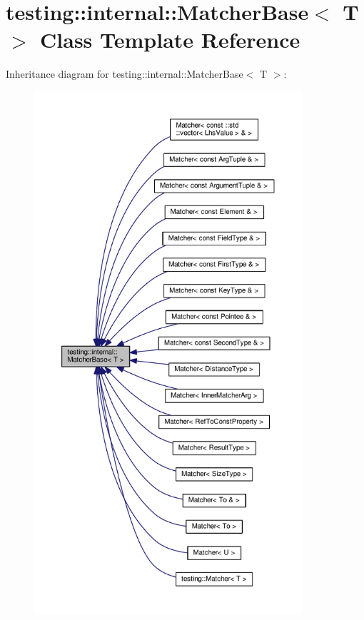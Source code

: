 \hypertarget{classtesting_1_1internal_1_1MatcherBase}{}\section{testing\+:\+:internal\+:\+:Matcher\+Base$<$ T $>$ Class Template Reference}
\label{classtesting_1_1internal_1_1MatcherBase}


Inheritance diagram for testing\+:\+:internal\+:\+:Matcher\+Base$<$ T $>$\+:\nopagebreak
\begin{figure}[H]
\begin{center}
\leavevmode
\includegraphics[height=550pt]{classtesting_1_1internal_1_1MatcherBase__inherit__graph}
\end{center}
\end{figure}
